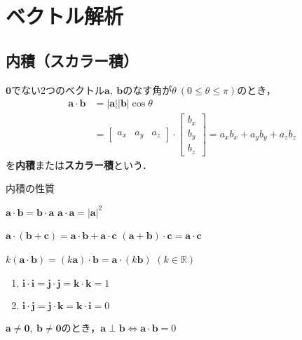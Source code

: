 \chapter{ベクトル解析}
\setcounter{page}{1}




\section{内積（スカラー積）}

$\bm{0}$でない2つのベクトル$\bm{a},\ \bm{b}$のなす角が$\theta\ (0 \le \theta \le \pi)$のとき，
\begin{align}
	\bm{a} \cdot \bm{b} &= |\bm{a}||\bm{b}|\cos\theta\\
						&=
						\begin{bmatrix}
							a_x & a_y & a_z
						\end{bmatrix}
						\cdot
						\begin{bmatrix}
							b_x\\ b_y \\ b_z
						\end{bmatrix}
						= a_x b_x + a_y b_y + a_z b_z
\end{align}
を\textbf{内積}または\textbf{スカラー積}という．

\begin{kousiki}{内積の性質}
	\begin{enumerate}[label=\textbf{[\arabic*]}, labelsep=10pt, leftmargin=23pt]
		\item $\bm{a} \cdot \bm{b} = \bm{b} \cdot \bm{a}$ \qquad $\bm{a} \cdot \bm{a} = |\bm{a}|^2$
		\item $\bm{a} \cdot (\bm{b} + \bm{c}) = \bm{a} \cdot \bm{b} + \bm{a} \cdot \bm{c}$ \qquad $(\bm{a} + \bm{b}) \cdot \bm{c} = \bm{a} \cdot \bm{c}$
		\item $k(\bm{a} \cdot \bm{b}) = (k\bm{a}) \cdot \bm{b} = \bm{a} \cdot (k\bm{b})$ \qquad $(k \in \mathbb{R})$
		\item
			\begin{enumerate}[label=(\roman*), labelsep=10pt, leftmargin=23pt]
				\item $\bm{i} \cdot \bm{i} = \bm{j} \cdot \bm{j} = \bm{k} \cdot \bm{k} = 1$
				\item $\bm{i} \cdot \bm{j} = \bm{j} \cdot \bm{k} = \bm{k} \cdot \bm{i} = 0$
			\end{enumerate}
		\item $\bm{a} \ne \bm{0},\ \bm{b} \ne \bm{0}$のとき，$\bm{a} \perp \bm{b} \iff \bm{a} \cdot \bm{b} = 0$
	\end{enumerate}
	
\end{kousiki}



